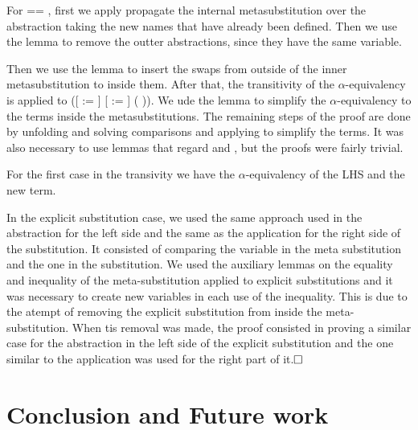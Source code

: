 For  == , first we apply  propagate the internal metasubstitution over the abstraction taking the new names that have already been defined. Then we use the lemma  to remove the outter abstractions, since they have the same variable. 
\begin{coqdoccode}
\end{coqdoccode}
Then we use the lemma  to insert the swaps from outside of the inner metasubstitution to inside them. After that, the transitivity of the $\alpha$-equivalency is applied to ([ := ] [ := ] (   )). We ude the lemma  to simplify the $\alpha$-equivalency to the terms inside the metasubstitutions. The remaining steps of the proof are done by unfolding and solving  comparisons and applying  to simplify the terms. It was also necessary to use lemmas that regard  and , but the proofs were fairly trivial.
\begin{coqdoccode}
\end{coqdoccode}
For the first case in the transivity we have the $\alpha$-equivalency of the LHS and the new term. 
\begin{coqdoccode}
\end{coqdoccode}
In the explicit substitution case, we used the same approach used in the abstraction for the left side and the same as the application for the right side of the substitution. It consisted of comparing the variable in the meta substitution and the one in the substitution. We used the auxiliary lemmas on the equality and inequality of the meta-substitution applied to explicit substitutions and it was necessary to create new variables in each use of the inequality. This is due to the atempt of removing the explicit substitution from inside the meta-substitution. When tis removal was made, the proof consisted in proving a similar case for the abstraction in the left side of the explicit substitution and the one similar to the application was used for the right part of it.$\hfill\Box$
\begin{coqdoccode}
\coqdocemptyline
\end{coqdoccode}
\section{Conclusion and Future work}



